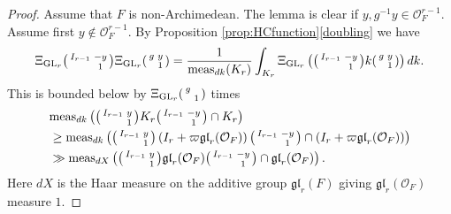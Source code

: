 \documentclass[12pt]{amsart}
\theoremstyle{remark}
\numberwithin{equation}{section}
\newcommand{\GL}{\mathrm{GL}}
\newcommand{\OO}{\mathcal{O}}
\theoremstyle{definition}
\newenvironment{psmatrix}
  {\left(\begin{smallmatrix}}
  {\end{smallmatrix}\right)}
\numberwithin{equation}{subsection}
\begin{document}
\begin{proof}
Assume that $F$ is non-Archimedean. The lemma is clear if $y,g^{-1}y\in \mathcal{O}_F^{r-1}.$ Assume first $y\not\in \mathcal{O}_F^{r-1}.$   By Proposition \ref{prop:HCfunction}\ref{doubling} we have
\begin{align*}
\Xi_{\GL_r}\begin{psmatrix} I_{r-1} & -y \\ &1\end{psmatrix}\Xi_{\GL_r}\begin{psmatrix} g & y \\ & 1 \end{psmatrix}=\frac{1}{\mathrm{meas}_{dk}(K_r)}\int_{K_r}\Xi_{\GL_r}\left(\begin{psmatrix} I_{r-1} & -y \\& 1\end{psmatrix}k\begin{psmatrix} g & y \\ & 1\end{psmatrix}\right)dk.
\end{align*}
This is bounded below by $\Xi_{\GL_r}\begin{psmatrix} g & \\ & 1 \end{psmatrix}$ times \begin{align*}
&\mathrm{meas}_{dk}\left(\begin{psmatrix} I_{r-1} & y \\ & 1\end{psmatrix} K_r\begin{psmatrix} I_{r-1} & -y \\ & 1\end{psmatrix} \cap K_r\right)\\&\geq \mathrm{meas}_{dk}\left(\begin{psmatrix} I_{r-1} & y \\ & 1\end{psmatrix} \left(I_r+\varpi\mathfrak{gl}_r(\OO_F)\right)\begin{psmatrix} I_{r-1} & -y \\ & 1\end{psmatrix} \cap \left(I_r +\varpi \mathfrak{gl}_r(\OO_F) \right) \right)\\
&\gg \mathrm{meas}_{dX}\left(\begin{psmatrix} I_{r-1} & y \\ & 1\end{psmatrix} \mathfrak{gl}_r(\OO_F)\begin{psmatrix} I_{r-1} & -y \\ & 1\end{psmatrix} \cap \mathfrak{gl}_r(\OO_F) \right).
\end{align*}
Here $dX$ is the Haar measure on the additive group $\mathfrak{gl}_r(F)$ giving $\mathfrak{gl}_r(\OO_F)$ measure $1.$ 


\end{proof}
\end{document}
